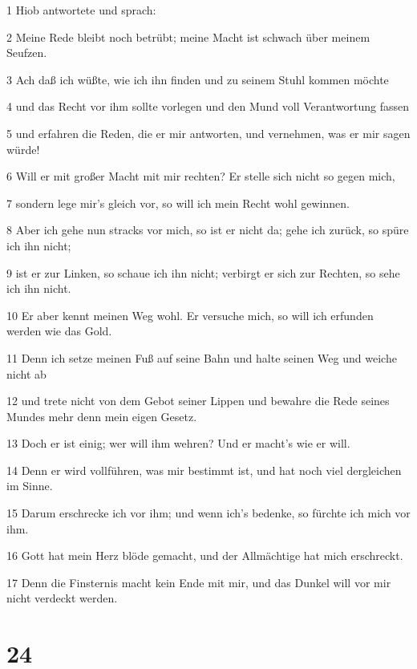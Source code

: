 \par 1 Hiob antwortete und sprach:
\par 2 Meine Rede bleibt noch betrübt; meine Macht ist schwach über meinem Seufzen.
\par 3 Ach daß ich wüßte, wie ich ihn finden und zu seinem Stuhl kommen möchte
\par 4 und das Recht vor ihm sollte vorlegen und den Mund voll Verantwortung fassen
\par 5 und erfahren die Reden, die er mir antworten, und vernehmen, was er mir sagen würde!
\par 6 Will er mit großer Macht mit mir rechten? Er stelle sich nicht so gegen mich,
\par 7 sondern lege mir's gleich vor, so will ich mein Recht wohl gewinnen.
\par 8 Aber ich gehe nun stracks vor mich, so ist er nicht da; gehe ich zurück, so spüre ich ihn nicht;
\par 9 ist er zur Linken, so schaue ich ihn nicht; verbirgt er sich zur Rechten, so sehe ich ihn nicht.
\par 10 Er aber kennt meinen Weg wohl. Er versuche mich, so will ich erfunden werden wie das Gold.
\par 11 Denn ich setze meinen Fuß auf seine Bahn und halte seinen Weg und weiche nicht ab
\par 12 und trete nicht von dem Gebot seiner Lippen und bewahre die Rede seines Mundes mehr denn mein eigen Gesetz.
\par 13 Doch er ist einig; wer will ihm wehren? Und er macht's wie er will.
\par 14 Denn er wird vollführen, was mir bestimmt ist, und hat noch viel dergleichen im Sinne.
\par 15 Darum erschrecke ich vor ihm; und wenn ich's bedenke, so fürchte ich mich vor ihm.
\par 16 Gott hat mein Herz blöde gemacht, und der Allmächtige hat mich erschreckt.
\par 17 Denn die Finsternis macht kein Ende mit mir, und das Dunkel will vor mir nicht verdeckt werden.

\chapter{24}

